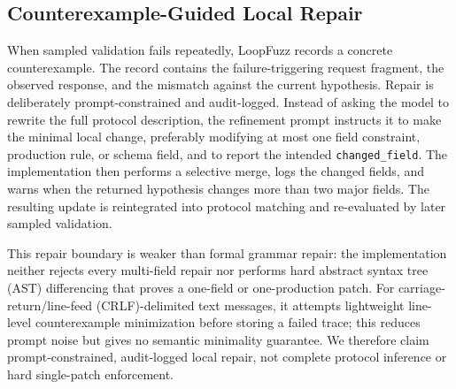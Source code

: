 \documentclass[final,5p,times,number]{elsarticle}
\begin{document}
\subsection{Counterexample-Guided Local Repair}
When sampled validation fails repeatedly, LoopFuzz records a concrete counterexample. The record contains the failure-triggering request fragment, the observed response, and the mismatch against the current hypothesis. Repair is deliberately prompt-constrained and audit-logged. Instead of asking the model to rewrite the full protocol description, the refinement prompt instructs it to make the minimal local change, preferably modifying at most one field constraint, production rule, or schema field, and to report the intended \texttt{changed\_field}. The implementation then performs a selective merge, logs the changed fields, and warns when the returned hypothesis changes more than two major fields. The resulting update is reintegrated into protocol matching and re-evaluated by later sampled validation.

This repair boundary is weaker than formal grammar repair: the implementation neither rejects every multi-field repair nor performs hard abstract syntax tree (AST) differencing that proves a one-field or one-production patch. For carriage-return/line-feed (CRLF)-delimited text messages, it attempts lightweight line-level counterexample minimization before storing a failed trace; this reduces prompt noise but gives no semantic minimality guarantee. We therefore claim prompt-constrained, audit-logged local repair, not complete protocol inference or hard single-patch enforcement.
\end{document}
